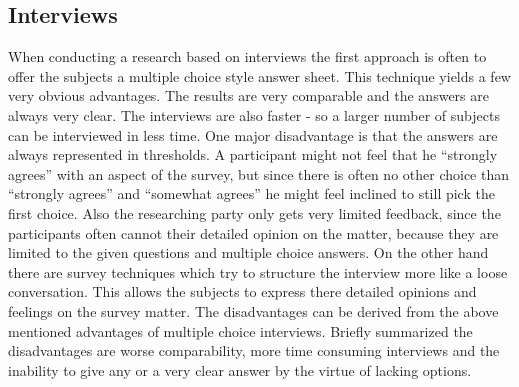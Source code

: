 \documentclass{sigchi}
\begin{document}
\subsection{Interviews}

When conducting a research based on interviews the first approach is often to offer the subjects a multiple choice style answer sheet. This technique yields a few very obvious advantages. The results are very comparable and the answers are always very clear. The interviews are also faster - so a larger number of subjects can be interviewed in less time. One major disadvantage is that the answers are always represented in thresholds. A participant might not feel that he “strongly agrees” with an aspect of the survey, but since there is often no other choice than “strongly agrees” and “somewhat agrees” he might feel inclined to still pick the first choice. Also the researching party only gets very limited feedback, since the participants often cannot their detailed opinion on the matter, because they are limited to the given questions and multiple choice answers. On the other hand there are survey techniques which try to structure the interview more like a loose conversation. This allows the subjects to express there detailed opinions and feelings on the survey matter. The disadvantages can be derived from the above mentioned advantages of multiple choice interviews. Briefly summarized the disadvantages are worse comparability, more time consuming interviews and the inability to give any or a very clear answer by the virtue of lacking options.
\end{document}
